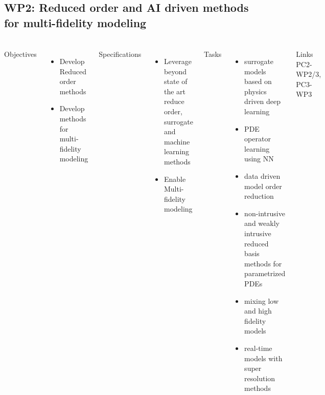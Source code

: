\subsection{WP2: Reduced order and AI driven methods for multi-fidelity modeling} 
\begin{frame}
  \frametitle{\insertsectionhead}
  \framesubtitle{\insertsubsectionhead}

  \begin{columns}[t]
    Objectives
    \begin{itemize}
      \item Develop Reduced order methods 
      \item Develop methods for multi-fidelity modeling 
    \end{itemize}

      Specifications
      \begin{itemize}
        \item Leverage beyond state of the art reduce order, surrogate and machine learning methods
        \item Enable Multi-fidelity modeling
      \end{itemize}
    Tasks
    \begin{itemize}
      \item surrogate models based on physics driven deep learning
      \item PDE operator learning using NN
      \item data driven model order reduction
      \item non-intrusive and weakly intrusive reduced basis methods for parametrized PDEs
      \item mixing low and high fidelity models
      \item real-time models with super resolution methods
    \end{itemize}
    \begin{alertblock}{Links}
      PC2-WP2/3, PC3-WP3
    \end{alertblock}

  \end{columns}
\end{frame}

